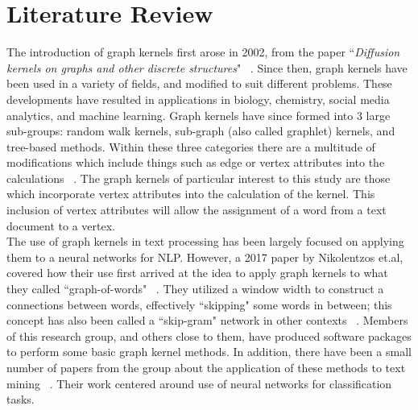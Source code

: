 %
%
%

\chapter{Literature Review}
\label{literature-review}




The introduction of graph kernels first arose in 2002, from the paper ``\textit{Diffusion kernels on graphs and other discrete structures}" ~\cite{kondor2002diffusion}. Since then, graph kernels have been used in a variety of fields, and modified to suit different problems. These developments have resulted in applications in biology, chemistry, social media analytics, and machine learning. Graph kernels have since formed into 3 large sub-groups: random walk kernels, sub-graph (also called graphlet) kernels, and tree-based methods. Within these three categories there are a multitude of modifications which include things such as edge or vertex attributes into the calculations ~\cite{vishwanathan2010graph}. The graph kernels of particular interest to this study are those which incorporate vertex attributes into the calculation of the kernel.  This inclusion of vertex attributes will allow the assignment of a word from a text document to a vertex. \\
The use of graph kernels in text processing has been largely focused on applying them to a neural networks for NLP. However, a 2017 paper by Nikolentzos et.al, covered how their use first arrived at the idea to apply graph kernels to what they called ``graph-of-words" ~\cite{nikolentzos2017shortest}. They utilized a window width to construct a connections between words, effectively ``skipping" some words in between; this concept has also been called a ``skip-gram" network in other contexts ~\cite{cheng2006n}. Members of this research group, and others close to them, have produced software packages to perform some basic graph kernel methods. In addition, there have been a small number of papers from the group about the application of these methods to text mining ~\cite{sugiyama2018graphkernels}. Their work centered around use of neural networks for classification tasks. 
